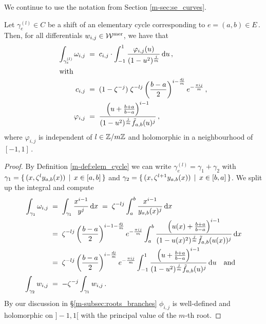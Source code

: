 \documentclass[main.tex]{subfiles}
\begin{document}
  We continue to use the notation from Section \ref{m-sec:se_curves}. 
  
  \begin{thm}\label{thm:periods}
   Let $\gamma_e^{(l)} \in C$ be a shift of an elementary cycle corresponding to $e = (a,b) \in E$\,. Then, for all differentials $w_{i,j} \in \mathcal{W}^{\text{mer}}$, we have that
   \begin{align}
    \int_{\gamma_e^{(l)}} \omega_{i,j} \; & = \; c_{i,j} \cdot \int_{-1}^1 \frac{\varphi_{i,j}(u)}{(1-u^2)^{\frac{j}{m}}} \, \mathrm d u \,, \\
    \intertext{with}
    c_{i,j} \; & = \; (1-\zeta^{-j}) \; \zeta^{-lj} \left(\frac{b-a}{2}\right)^{i-\frac{dj}{m}} e^{-\frac{\pi i j}{m}} \,, \\ 
    \varphi_{i,j} \; & = \;
    \frac{\left(u+\frac{b+a}{b-a}\right)^{i-1}}{(1-u^2)^{\frac{j}{m}}\tilde{f}_{a,b}(u)^j}\,,
   \end{align}
   where $\varphi_{i,j}$ is independent of $l \in \mathbb{Z}/m\mathbb{Z}$ and holomorphic in a neighbourhood of $[-1,1]$\,.

  \end{thm}
  \begin{proof}
    By Definition \ref{m-def:elem_cycle} we can write $\gamma_e^{(l)} = \gamma_1 + \gamma_2$ with $\gamma_1 = \{ \, (x,\zeta^l y_{a,b}(x)) \, \mid \, x \in [a,b] \, \}$ and
    $\gamma_2 = \{ \, (x,\zeta^{l+1}y_{a,b}(x)) \, \mid \, x \in [b,a] \, \}$. We split up the integral and compute
    \begin{align}\label{eq:thm_periods_1}
     \int_{\gamma_1} \omega_{i,j} \; & = \; \int_{\gamma_1} \frac{x^{i-1}}{y^j} \, \mathrm d x \; = \; \zeta^{-lj} \int_a^b \frac{x^{i-1}}{y_{a,b}(x)^j} \, \mathrm d x \\ \; & = \; 
     \zeta^{-lj} \left(\frac{b-a}{2}\right)^{i-1-\frac{dj}{m}} e^{-\frac{\pi i j}{m}} 
     \int_a^b \frac{\left(u(x)+\frac{b+a}{b-a}\right)^{i-1}}{(1-u(x)^2)^{\frac{j}{m}}\tilde{f}_{a,b}(u(x))^j} \, \mathrm d x \\
     \; & = \;   \zeta^{-lj} \left(\frac{b-a}{2}\right)^{i-\frac{dj}{m}} e^{-\frac{\pi i j}{m}}  
     \int_{-1}^1 \frac{\left(u+\frac{b+a}{b-a}\right)^{i-1}}{(1-u^2)^{\frac{j}{m}}\tilde{f}_{a,b}(u)^j} \, \mathrm d u \quad \text{and} \\
    \int_{\gamma_2} w_{i,j} \; & = \; - \zeta^{-j} \int_{\gamma_1} w_{i,j}\,.
  \end{align}
  By our discussion in \S \ref{m-subsec:roots_branches} $\phi_{i,j}$ is well-defined and holomorphic on $]-1,1[$ with the principal value of the $m$-th root.
  \end{proof}
  
\end{document}
